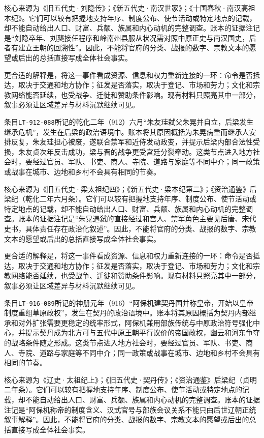 核心来源为《旧五代史·刘隐传》；《新五代史·南汉世家》；《十国春秋·南汉高祖本纪》。它们可以较有把握地支持年序、制度公布、使节活动或特定地点的记载，却不能自动给出人口、财富、兵额、族属和内心动机的完整调查。账本的证据注记是“刘隐卒年、刘龑接任程序和岭南州县服从状况需对照中原正史与南汉国史，后者有建立王朝的回溯性”。因此，不能将官府的分类、战报的数字、宗教文本的愿望或后出的总括直接写成全体社会事实。

更合适的解释是，将这一事件看成资源、信息和权力重新连接的一环：命令是否抵达，取决于交通和地方协作；征发是否落实，取决于登记、市场和劳力；文化和宗教网络能否延续，也受战争、迁徙和赞助条件影响。现有材料只照亮其中一部分，叙事必须让区域差异与材料沉默继续可见。

条目\texttt{LT-912-088}所记的乾化二年（912）六月“朱友珪弑父朱晃并自立，后梁发生继承危机”，发生在后梁的政治语境中。账本将其原因概括为朱晃病重而继承人安排反复，朱友珪担心被废，遂联合禁军和近侍发动政变，并提示后梁内部合法性受损，朱友贞次年反击成功，梁与晋的战争更受宫廷分裂牵动。这类节点进入地方社会时，要经过官员、军队、书吏、商人、寺院、道路与家庭等不同中介；同一政策或战事在城市、边地和乡村不会具有相同的节奏。

核心来源为《旧五代史·梁太祖纪四》；《新五代史·梁本纪第二》；《资治通鉴》后梁纪（乾化二年六月条）。它们可以较有把握地支持年序、制度公布、使节活动或特定地点的记载，却不能自动给出人口、财富、兵额、族属和内心动机的完整调查。账本的证据注记是“朱晃遇弑的直接经过和宫人、禁军角色主要见后唐、宋代史书，具体责任存在政治化叙述”。因此，不能将官府的分类、战报的数字、宗教文本的愿望或后出的总括直接写成全体社会事实。

更合适的解释是，将这一事件看成资源、信息和权力重新连接的一环：命令是否抵达，取决于交通和地方协作；征发是否落实，取决于登记、市场和劳力；文化和宗教网络能否延续，也受战争、迁徙和赞助条件影响。现有材料只照亮其中一部分，叙事必须让区域差异与材料沉默继续可见。

条目\texttt{LT-916-089}所记的神册元年（916）“阿保机建契丹国并称皇帝，开始以皇帝制度重组草原政权”，发生在契丹的政治语境中。账本将其原因概括为契丹内部继承和对外扩张需要更稳定的统率形式，阿保机兼用部族传统与中原政治符号强化中心，并提示契丹成为北方可与五代中原王朝平行议价的帝国政权，幽云和河东争夺的战略条件随之形成。这类节点进入地方社会时，要经过官员、军队、书吏、商人、寺院、道路与家庭等不同中介；同一政策或战事在城市、边地和乡村不会具有相同的节奏。

核心来源为《辽史·太祖纪上》；《旧五代史·契丹传》；《资治通鉴》后梁纪（贞明二年条）。它们可以较有把握地支持年序、制度公布、使节活动或特定地点的记载，却不能自动给出人口、财富、兵额、族属和内心动机的完整调查。账本的证据注记是“阿保机称帝的制度含义、汉式官号与部族会议关系不能只由后世辽朝正统叙事解释”。因此，不能将官府的分类、战报的数字、宗教文本的愿望或后出的总括直接写成全体社会事实。

